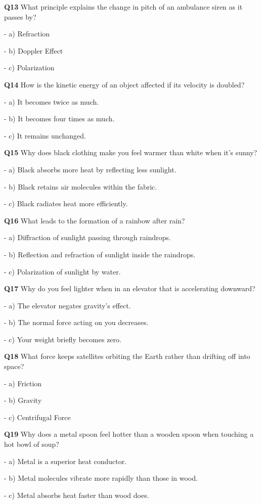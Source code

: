 \textbf{Q13} What principle explains the change in pitch of an ambulance siren as it passes by?\par
\quad - a) Refraction\par
\quad - b) Doppler Effect\par
\quad - c) Polarization\par

\textbf{Q14} How is the kinetic energy of an object affected if its velocity is doubled?\par
\quad - a) It becomes twice as much.\par
\quad - b) It becomes four times as much.\par
\quad - c) It remains unchanged.\par

\textbf{Q15} Why does black clothing make you feel warmer than white when it's sunny?\par
\quad - a) Black absorbs more heat by reflecting less sunlight.\par
\quad - b) Black retains air molecules within the fabric.\par
\quad - c) Black radiates heat more efficiently.\par

\textbf{Q16} What leads to the formation of a rainbow after rain?\par
\quad - a) Diffraction of sunlight passing through raindrops.\par
\quad - b) Reflection and refraction of sunlight inside the raindrops.\par
\quad - c) Polarization of sunlight by water.\par

\textbf{Q17} Why do you feel lighter when in an elevator that is accelerating downward?\par
\quad - a) The elevator negates gravity's effect.\par
\quad - b) The normal force acting on you decreases.\par
\quad - c) Your weight briefly becomes zero.\par

\textbf{Q18} What force keeps satellites orbiting the Earth rather than drifting off into space?\par
\quad - a) Friction\par
\quad - b) Gravity\par
\quad - c) Centrifugal Force\par

\textbf{Q19} Why does a metal spoon feel hotter than a wooden spoon when touching a hot bowl of soup?\par
\quad - a) Metal is a superior heat conductor.\par
\quad - b) Metal molecules vibrate more rapidly than those in wood.\par
\quad - c) Metal absorbs heat faster than wood does.\par

